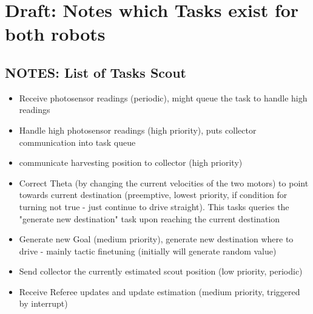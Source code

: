 \documentclass[12pt]{article}
\begin{document}
\lstset{language=C++}

\section*{Draft: Notes which Tasks exist for both robots}

\subsection*{NOTES: List of Tasks Scout}
\begin{itemize}
  \item Receive photosensor readings (periodic), might queue the task to handle high readings
  \item Handle high photosensor readings (high priority), puts collector communication into task queue
  \item communicate harvesting position to collector (high priority)
  \item Correct Theta (by changing the current velocities of the two motors) to point towards current destination (preemptive, lowest priority, if condition for turning not true - just continue to drive straight). This tasks queries the "generate new destination" task upon reaching the current destination
  \item Generate new Goal (medium priority), generate new destination where to drive - mainly tactic finetuning (initially will generate random value)
  \item Send collector the currently estimated scout position (low priority, periodic)
  \item Receive Referee updates and update estimation (medium priority, triggered by interrupt)
\end{itemize}
\end{document}
